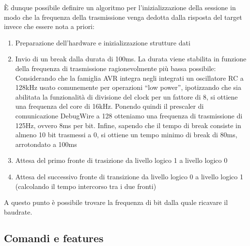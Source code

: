 È dunque possibile definire un algoritmo per l'inizializzazione della sessione in modo che la frequenza della trasmissione venga dedotta dalla risposta del target invece che essere nota a priori:
\begin{enumerate}
    \item Preparazione dell'hardware e inizializzazione strutture dati
    \item Invio di un break dalla durata di 100ms. La durata viene stabilita in funzione della frequenza di trasmissione ragionevolmente più bassa possibile: Considerando che la famiglia AVR integra negli integrati un oscillatore RC a 128kHz usato comunemente per operazioni ``low power'', ipotizzando che sia abilitata la funzionalità di divisione del clock per un fattore di 8\cite{avr:m328p}, si ottiene una frequenza del core di 16kHz. Ponendo quindi il prescaler di comunicazione DebugWire a 128 otteniamo una frequenza di trasmissione di 125Hz, ovvero 8ms per bit. Infine, sapendo che il tempo di break consiste in almeno 10 bit trasmessi a 0, si ottiene un tempo minimo di break di 80ms, arrotondato a 100ms
    \item Attesa del primo fronte di trasizione da livello logico 1 a livello logico 0
    \item Attesa del successivo fronte di transizione da livello logico 0 a livello logico 1 (calcolando il tempo intercorso tra i due fronti)
\end{enumerate}

A questo punto è possibile trovare la frequenza di bit dalla quale ricavare il baudrate.

\subsection{Comandi e features}
